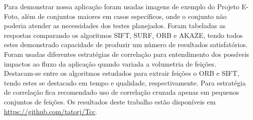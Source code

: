 Para demonstrar nossa aplicação foram usadas imagens de exemplo do Projeto E-Foto, além de conjuntos maiores em casos específicos, onde o conjunto não poderia atender as necessidades dos testes planejados. Foram tabeladas as respostas comparando os algoritmos SIFT, SURF, ORB e AKAZE, tendo todos estes demonstrado capacidade de produzir um número de resultados satisfatórios. Foram usadas diferentes estratégias de correlação para entendimento dos possíveis impactos ao fluxo da aplicação quando variada a volumetria de feições.
Destacam-se entre os algoritmos estudados para extrair feições o ORB e SIFT, tendo estes se destacado em tempo e qualidade, respectivamente. Para estratégia de correlação fica recomendado uso de correlação cruzada apenas em pequenos conjuntos de feições.
Os resultados deste trabalho estão disponíveis em \url{https://github.com/tatorj/Tcc}.

\imprimirchaves